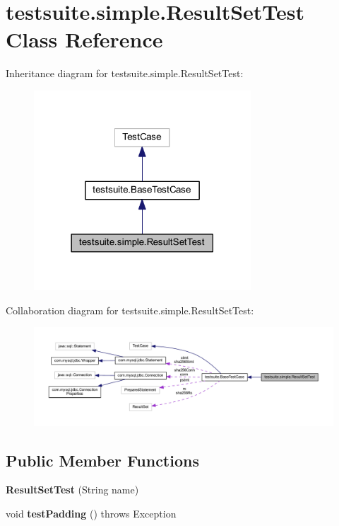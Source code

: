 \hypertarget{classtestsuite_1_1simple_1_1_result_set_test}{}\section{testsuite.\+simple.\+Result\+Set\+Test Class Reference}
\label{classtestsuite_1_1simple_1_1_result_set_test}


Inheritance diagram for testsuite.\+simple.\+Result\+Set\+Test\+:
\nopagebreak
\begin{figure}[H]
\begin{center}
\leavevmode
\includegraphics[width=230pt]{classtestsuite_1_1simple_1_1_result_set_test__inherit__graph}
\end{center}
\end{figure}


Collaboration diagram for testsuite.\+simple.\+Result\+Set\+Test\+:
\nopagebreak
\begin{figure}[H]
\begin{center}
\leavevmode
\includegraphics[width=350pt]{classtestsuite_1_1simple_1_1_result_set_test__coll__graph}
\end{center}
\end{figure}
\subsection*{Public Member Functions}
\begin{DoxyCompactItemize}
\item 
\mbox{\label{classtestsuite_1_1simple_1_1_result_set_test_a88a576d293713b9a39cd1a25dba38cbe}} 
{\bfseries Result\+Set\+Test} (String name)
\item 
\mbox{\label{classtestsuite_1_1simple_1_1_result_set_test_acf1c1c4e051b0f5eb985231600a7de9a}} 
void {\bfseries test\+Padding} ()  throws Exception 
\end{DoxyCompactItemize}

